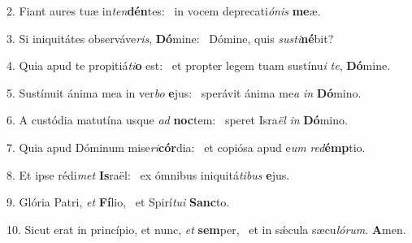 2. Fiant aures tuæ in\textit{ten}\textbf{dén}tes: \ast\  in vocem deprecati\textit{ó}\textit{nis} \textbf{me}æ.\

3. Si iniquitátes observáve\textit{ris}, \textbf{Dó}mine: \ast\  Dómine, quis \textit{sus}\textit{ti}\textbf{né}bit?\

4. Quia apud te propitiá\textit{ti}\textbf{o} est: \ast\  et propter legem tuam sustínu\textit{i} \textit{te}, \textbf{Dó}mine.\

5. Sustínuit ánima mea in ver\textit{bo} \textbf{e}jus: \ast\  sperávit ánima me\textit{a} \textit{in} \textbf{Dó}mino.\

6. A custódia matutína usque \textit{ad} \textbf{noc}tem: \ast\  speret Isra\textit{ël} \textit{in} \textbf{Dó}mino.\

7. Quia apud Dóminum mise\textit{ri}\textbf{cór}dia: \ast\  et copiósa apud e\textit{um} \textit{red}\textbf{émp}tio.\

8. Et ipse rédi\textit{met} \textbf{Is}raël: \ast\  ex ómnibus iniquitá\textit{ti}\textit{bus} \textbf{e}jus.\

9. Glória Patri, \textit{et} \textbf{Fí}lio, \ast\  et Spirí\textit{tu}\textit{i} \textbf{Sanc}to.\

10. Sicut erat in princípio, et nunc, \textit{et} \textbf{sem}per, \ast\  et in sǽcula sæcu\textit{ló}\textit{rum}. \textbf{A}men.\


